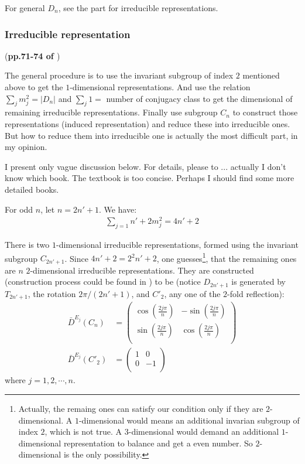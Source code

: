 For general $D_n$, see the part for irreducible representations.

\subsubsection{Irreducible representation} 

(\textbf{pp.71-74 of \cite{book}}) 

The general procedure is to use the invariant subgroup of index $2$
mentioned above to get the $1$-dimensional representations. And use
the relation $\sum_j m_j^2 = |D_n|$ and $\sum_j 1 = $ number of
conjugacy class to get the dimensional of remaining irreducible
representations. Finally use subgroup $C_n$ to construct those
representations (induced representation) and reduce these into
irreducible ones. But how to reduce them into irreducible one is
actually the most difficult part, in my opinion.

I present only vague discussion below. For details, please to ...
actually I don't know which book. The textbook \cite{book} is too
concise. Perhaps I should find some more detailed books.

For odd $n$, let $n=2n'+1$. We have:
\begin{align}
    \sum_{j=1}{n'+2} m_j^2 = 4n'+2
\end{align}

There is two $1$-dimensional irreducible representations, formed using
the invariant subgroup $C_{2n'+1}$. Since $4n'+2 = 2^2 n'+2$, one
guesses\footnote{Actually, the remaing ones can satisfy our condition
    only if they are $2$-dimensional. A $1$-dimensional would means an
    additional invarian subgroup of index $2$, which is not true. A
    $3$-dimensional would demand an additional $1$-dimensional
    representation to balance and get a even number. So
$2$-dimensional is the only possibility.}, that the remaining ones are
$n$ $2$-dimensional irreducible representations. They are constructed
(construction process could be found in \cite{book}) to be (notice
$D_{2n'+1}$ is generated by $T_{2n'+1}$, the rotation
$2\pi/(2n'+1)$, and $C'_2$, any one of the $2$-fold reflection):
\begin{align}
    \bar{D}^{E_j}(C_{n}) &=\left( \begin{array}{cc}
    \cos(\frac{2j\pi}{n}) & -\sin(\frac{2j\pi}{n}) \\
    \sin(\frac{2j\pi}{n}) & \cos(\frac{2j\pi}{n}) \\
        \end{array} \right) \\
    \bar{D}^{E_j}(C'_{2}) &= \left( \begin{array}{cc}
                 1 & 0 \\
                 0 & -1 \\ 
                 \end{array} \right)
\end{align}
where $j=1,2,\cdots,n$.

